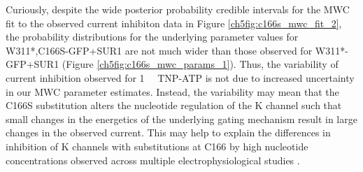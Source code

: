 Curiously, despite the wide posterior probability credible intervals for the MWC fit to the observed current inhibiton data in Figure \ref{ch5fig:c166s_mwc_fit_2}, the probability distributions for the underlying parameter values for W311*,C166S-GFP+SUR1 are not much wider than those observed for W311*-GFP+SUR1 (Figure \ref{ch5fig:c166s_mwc_params_1}).
Thus, the variability of current inhibition observed for \SI{1}{\milli\Molar} TNP-ATP is not due to increased uncertainty in our MWC parameter estimates.
Instead, the variability may mean that the C166S substitution alters the nucleotide regulation of the K\ATP{} channel such that small changes in the energetics of the underlying gating mechanism result in large changes in the observed current.
This may help to explain the differences in inhibition of K\ATP{} channels with substitutions at C166 by high nucleotide concentrations observed across multiple electrophysiological studies \cite{trapp_mechanism_1998, enkvetchakul_atp_2001-1, ribalet_atp-sensitive_2006-1, yang_palmitoylation_2020}.


